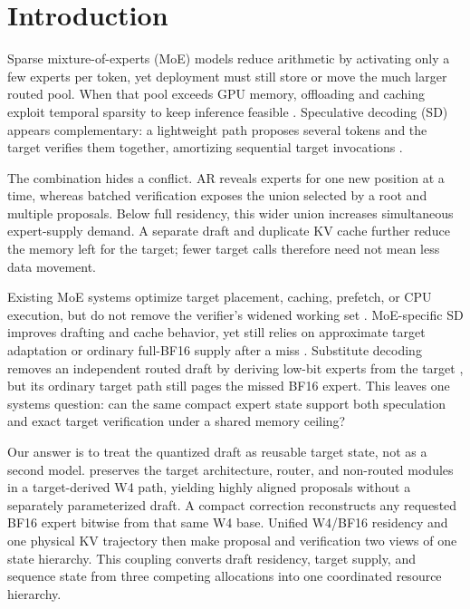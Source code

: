 \section{Introduction}
\label{sec:introduction}

Sparse mixture-of-experts (MoE) models reduce arithmetic by activating only a few
experts per token, yet deployment must still store or move the much larger routed
pool. When that pool exceeds GPU memory, offloading and caching exploit temporal
sparsity to keep inference feasible
\cite{eliseev2023offloading,xue2024moeinfinity,kamahori2025fiddler}. Speculative
decoding (SD) appears complementary: a lightweight path proposes several tokens and
the target verifies them together, amortizing sequential target invocations
\cite{leviathan2023fast}.

The combination hides a conflict. AR reveals experts for one new position at a time,
whereas batched verification exposes the union selected by a root and multiple
proposals. Below full residency, this wider union increases simultaneous expert-supply
demand. A separate draft and duplicate KV cache further reduce the memory left for
the target; fewer target calls therefore need not mean less data movement.

Existing MoE systems optimize target placement, caching, prefetch, or CPU execution,
but do not remove the verifier's widened working set
\cite{xue2024moeinfinity,du2024sida,kong2024swapmoe,cao2025moelightning}. MoE-specific
SD improves drafting and cache behavior, yet still relies on approximate target
adaptation or ordinary full-BF16 supply after a miss
\cite{huang2025moesd,zheng2026ssmoe,bang2026specmoe}. Substitute decoding removes an
independent routed draft by deriving low-bit experts from the target
\cite{wang2025subspec}, but its ordinary target path still pages the missed BF16
expert. This leaves one systems question: can the same compact expert state support
both speculation and exact target verification under a shared memory ceiling?

Our answer is to treat the quantized draft as reusable target state, not as a second
model. \system preserves the target architecture, router, and non-routed modules in a
target-derived W4 path, yielding highly aligned proposals without a separately
parameterized draft. A compact correction reconstructs any requested BF16 expert
bitwise from that same W4 base. Unified W4/BF16 residency and one physical KV
trajectory then make proposal and verification two views of one state hierarchy.
This coupling converts draft residency, target supply, and sequence state from three
competing allocations into one coordinated resource hierarchy.

